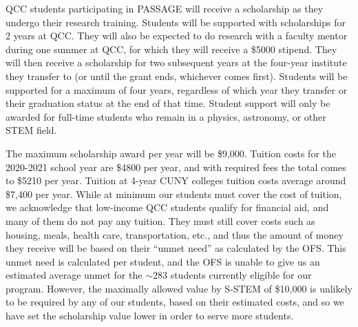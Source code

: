 \documentclass[12pt]{article}
\begin{document}
QCC students participating in PASSAGE will receive a scholarship as they undergo their research training. Students will be supported with scholarships for 2 years at QCC.  They will also be expected to do research with a faculty mentor during one summer at QCC, for which they will receive a \$5000 stipend.  They will then receive a scholarship for two subsequent years at the four-year institute they transfer to (or until the grant ends, whichever comes first).  Students will be supported for a maximum of four years, regardless of which year they transfer or their graduation status at the end of that time. Student support will only be awarded for full-time students who remain in a physics, astronomy, or other STEM field.  

The maximum scholarship award per year will be \$9,000. Tuition costs for the 2020-2021 school year are \$4800 per year, and with required fees the total comes to \$5210 per year.  Tuition at 4-year CUNY colleges tuition costs average around \$7,400 per year.  While at minimum our students must cover the cost of tuition, we acknowledge that low-income QCC students qualify for financial aid, and many of them do not pay any tuition.  They must still cover costs such as housing, meals, health care, transportation, etc., and thus the amount of money they receive will be based on their ``unmet need'' as calculated by the OFS.   This unmet need is calculated  per student, and the OFS is unable to give us an estimated average unmet for the $\sim$283 students currently eligible for our program.  However,    the maximally allowed value by S-STEM of \$10,000 is unlikely to be required by any of our students, based on their estimated costs, and so we have set the scholarship value lower in order to serve more students.
\end{document}
